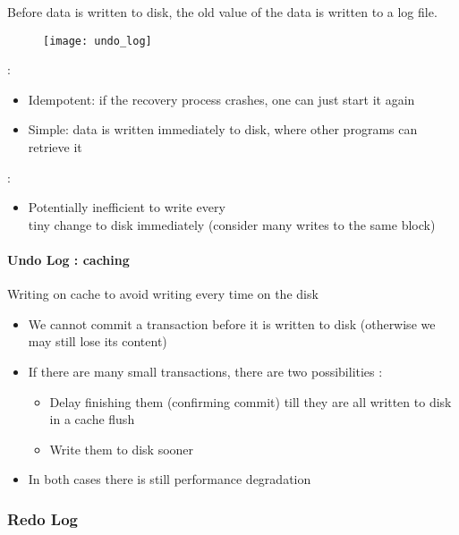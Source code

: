 Before data is written to disk, the old value of the data is written to a log file.

\begin{figure}[H]
    \centering
    \texttt{[image: undo\_log]}
\end{figure}

\begin{minipage}{0.48\textwidth}
 :
\begin{itemize}
    \item Idempotent: if the recovery process crashes, one can just start it again
    \item Simple: data is written immediately to disk, where other programs can retrieve it
\end{itemize}
\end{minipage}
\hfill
\begin{minipage}{0.48\textwidth}
 :
\begin{itemize}
    \item Potentially inefficient to write every\\tiny change to disk immediately (consider many writes to the same block)
\end{itemize}
\end{minipage}

\paragraph{Undo Log : caching}

Writing on cache to avoid writing every time on the disk

\begin{itemize}
    \item We cannot commit a transaction before it is written to disk (otherwise we may still lose its content)
    \item If there are many small transactions, there are two possibilities :
    \begin{itemize}
        \item Delay finishing them (confirming commit) till they are all written to disk in a cache flush
        \item Write them to disk sooner
    \end{itemize}
    \item In both cases there is still performance degradation
\end{itemize}

\subsubsection{Redo Log}

